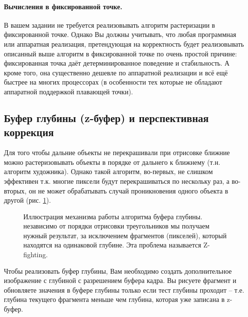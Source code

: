 \documentclass[12pt,subf,href,colorlinks=true]{article}
\begin{document}
\paragraph{Вычисления в фиксированной точке.} В вашем задании не требуется реализовывать алгоритм растеризации в фиксированной точке. Однако Вы должны учитывать, что любая программная или аппаратная реализация, претендующая на корректность будет реализовывать описанный выше алгоритм в фиксированной точке по очень простой причине: фиксированная точка даёт детерминированное поведение и стабильность. А кроме того, она существенно дешевле по аппаратной реализации и всё ещё быстрее на многих процессорах (в особенности тех которые не обладают аппаратной поддержкой плавающей точки). 

\subsection{Буфер глубины (z-буфер) и перспективная коррекция}

Для того чтобы дальние объекты не перекрашивали при отрисовке ближние можно растеризовывать объекты в порядке от дальнего к ближнему (т.н. алгоритм художника). Однако такой алгоритм, во-первых, не слишком эффективен т.к. многие пиксели будут перекрашиваться по нескольку раз, а во-вторых, он не может обрабатывать случай проникновения одного объекта в другой (рис. \ref{fig:zbuffer}).

\begin{figure}[h]
	\caption{Иллюстрация механизма работы алгоритма буфера глубины. независимо от порядки отрисовки треугольников мы получаем нужный результат, за исключением фрагментов (пикселей), который находятся на одинаковой глубине. Эта проблема называется Z-fighting.}
	\label{fig:zbuffer}
\end{figure}

Чтобы реализовать буфер глубины, Вам необходимо создать дополнительное изображение с глубиной с разрешением буфера кадра. Вы рисуете фрагмент и обновляете значения в буфере глубины только если тест глубины проходит -- т.е. глубина текущего фрагмента меньше чем глубина, которая уже записана в z-буфер.
\end{document}
